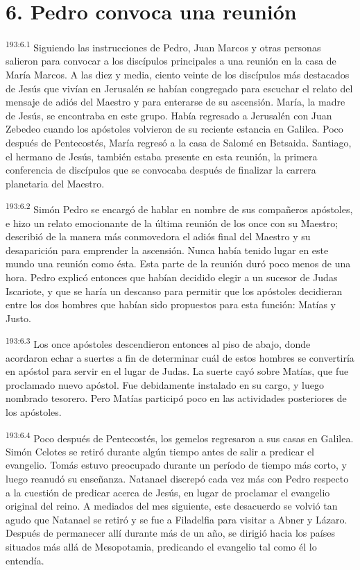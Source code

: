 \section*{6. Pedro convoca una reunión}
\par 
\textsuperscript{193:6.1} Siguiendo las instrucciones de Pedro, Juan Marcos y otras personas salieron para convocar a los discípulos principales a una reunión en la casa de María Marcos. A las diez y media, ciento veinte de los discípulos más destacados de Jesús que vivían en Jerusalén se habían congregado para escuchar el relato del mensaje de adiós del Maestro y para enterarse de su ascensión. María, la madre de Jesús, se encontraba en este grupo. Había regresado a Jerusalén con Juan Zebedeo cuando los apóstoles volvieron de su reciente estancia en Galilea. Poco después de Pentecostés, María regresó a la casa de Salomé en Betsaida. Santiago, el hermano de Jesús, también estaba presente en esta reunión, la primera conferencia de discípulos que se convocaba después de finalizar la carrera planetaria del Maestro.

\par 
\textsuperscript{193:6.2} Simón Pedro se encargó de hablar en nombre de sus compañeros apóstoles, e hizo un relato emocionante de la última reunión de los once con su Maestro; describió de la manera más conmovedora el adiós final del Maestro y su desaparición para emprender la ascensión. Nunca había tenido lugar en este mundo una reunión como ésta. Esta parte de la reunión duró poco menos de una hora. Pedro explicó entonces que habían decidido elegir a un sucesor de Judas Iscariote, y que se haría un descanso para permitir que los apóstoles decidieran entre los dos hombres que habían sido propuestos para esta función: Matías y Justo.

\par 
\textsuperscript{193:6.3} Los once apóstoles descendieron entonces al piso de abajo, donde acordaron echar a suertes a fin de determinar cuál de estos hombres se convertiría en apóstol para servir en el lugar de Judas. La suerte cayó sobre Matías, que fue proclamado nuevo apóstol. Fue debidamente instalado en su cargo, y luego nombrado tesorero. Pero Matías participó poco en las actividades posteriores de los apóstoles.

\par 
\textsuperscript{193:6.4} Poco después de Pentecostés, los gemelos regresaron a sus casas en Galilea. Simón Celotes se retiró durante algún tiempo antes de salir a predicar el evangelio. Tomás estuvo preocupado durante un período de tiempo más corto, y luego reanudó su enseñanza. Natanael discrepó cada vez más con Pedro respecto a la cuestión de predicar acerca de Jesús, en lugar de proclamar el evangelio original del reino. A mediados del mes siguiente, este desacuerdo se volvió tan agudo que Natanael se retiró y se fue a Filadelfia para visitar a Abner y Lázaro. Después de permanecer allí durante más de un año, se dirigió hacia los países situados más allá de Mesopotamia, predicando el evangelio tal como él lo entendía.

